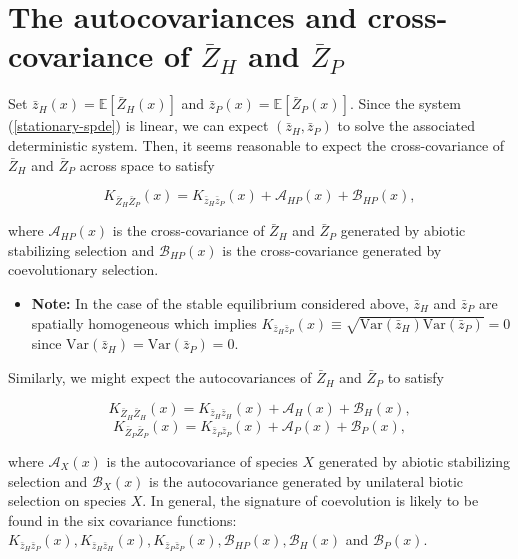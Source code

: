\documentclass{article}
\begin{document}
\hypertarget{the-autocovariances-and-cross-covariance-of-bar-z_h-and-bar-z_p}{%
\section{\texorpdfstring{The autocovariances and cross-covariance of
\(\bar Z_H\) and
\(\bar Z_P\)}{The autocovariances and cross-covariance of \textbackslash bar Z\_H and \textbackslash bar Z\_P}}\label{the-autocovariances-and-cross-covariance-of-bar-z_h-and-bar-z_p}}

Set \(\bar z_H(x)=\mathbb E[\bar Z_H(x)]\) and
\(\bar z_P(x)=\mathbb E[\bar Z_P(x)]\). Since the system
(\ref{stationary-spde}) is linear, we can expect \((\bar z_H,\bar z_P)\)
to solve the associated deterministic system. Then, it seems reasonable
to expect the cross-covariance of \(\bar Z_H\) and \(\bar Z_P\) across
space to satisfy

\begin{equation}
  K_{\bar Z_H\bar Z_P}(x)=K_{\bar z_H\bar z_P}(x)+\mathcal{A}_{HP}(x)+\mathcal B_{HP}(x),
\end{equation}

where \(\mathcal{A}_{HP}(x)\) is the cross-covariance of \(\bar Z_H\)
and \(\bar Z_P\) generated by abiotic stabilizing selection and
\(\mathcal B_{HP}(x)\) is the cross-covariance generated by
coevolutionary selection.

\begin{itemize}
\tightlist
\item
  \textbf{Note:} In the case of the stable equilibrium considered above,
  \(\bar z_H\) and \(\bar z_P\) are spatially homogeneous which implies
  \(K_{\bar z_H\bar z_P}(x)\equiv\sqrt{\mathrm{Var}(\bar z_H)\mathrm{Var}(\bar z_P)}=0\)
  since \(\mathrm{Var}(\bar z_H)=\mathrm{Var}(\bar z_P)=0\).
\end{itemize}

Similarly, we might expect the autocovariances of \(\bar Z_H\) and
\(\bar Z_P\) to satisfy

\begin{equation}
  K_{\bar Z_H\bar Z_H}(x)=K_{\bar z_H\bar z_H}(x)+\mathcal{A}_H(x)+\mathcal B_H(x),
\end{equation} \begin{equation}
  K_{\bar Z_P\bar Z_P}(x)=K_{\bar z_P\bar z_P}(x)+\mathcal{A}_P(x)+\mathcal B_P(x),
\end{equation}

where \(\mathcal{A}_X(x)\) is the autocovariance of species \(X\)
generated by abiotic stabilizing selection and \(\mathcal{B}_X(x)\) is
the autocovariance generated by unilateral biotic selection on species
\(X\). In general, the signature of coevolution is likely to be found in
the six covariance functions:
\(K_{\bar z_H\bar z_P}(x),K_{\bar z_H\bar z_H}(x),K_{\bar z_P\bar z_P}(x),\mathcal B_{HP}(x),\mathcal B_H(x)\)
and \(\mathcal B_P(x)\).
\end{document}
